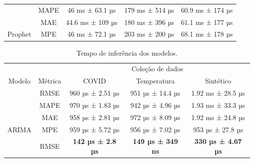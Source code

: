 \begin{table}[htbp]
\begin{tabular}{@{}ccccc@{}}
                                  & MAPE                      & \multicolumn{1}{c}{46 ms ± 63.1 µs}            & \multicolumn{1}{c}{179 ms ± 514 µs}           & 60.9 ms ± 174 µs          \\
                                  & MAE                       & \multicolumn{1}{c}{44.6 ms ± 109 µs}           & \multicolumn{1}{c}{180 ms ± 396 µs}           & 61.1 ms ± 177 µs          \\
        \multirow{-4}{*}{Prophet} & MPE                       & \multicolumn{1}{c}{46 ms ± 72.1 µs}            & \multicolumn{1}{c}{203 ms ± 200 µs}           & 68.1 ms ± 178 µs          \\ \bottomrule
    \end{tabular}
\end{table}

\begin{table}[htbp]
    \caption{Tempo de inferência dos modelos.}\label{tab:tempo_inferencia}
    \centering
    \begin{tabular}{@{}ccccc@{}} \toprule
                                  &                           & \multicolumn{3}{c}{Coleção de dados}                                                                                       \\ \cmidrule{3-5}
        \multirow{-2}{*}{Modelo}  & \multirow{-2}{*}{Métrica} & \multicolumn{1}{c}{COVID}                      & \multicolumn{1}{c}{Temperatura}               & Sintético                 \\ \midrule
                                  & RMSE                      & \multicolumn{1}{c}{960 µs ± 2.51 µs}           & \multicolumn{1}{c}{951 µs ± 14.4 µs}          & 1.92 ms ± 28.5 µs         \\
                                  & MAPE                      & \multicolumn{1}{c}{970 µs ± 1.83 µs}           & \multicolumn{1}{c}{942 µs ± 4.96 µs}          & 1.93 ms ± 33.3 µs         \\
                                  & MAE                       & \multicolumn{1}{c}{958 µs ± 2.81 µs}           & \multicolumn{1}{c}{972 µs ± 8.09 µs}          & 1.92 ms ± 24.8 µs         \\
        \multirow{-4}{*}{ARIMA}   & MPE                       & \multicolumn{1}{c}{959 µs ± 5.72 µs}           & \multicolumn{1}{c}{956 µs ± 7.02 µs}          & 953 µs ± 27.8 µs          \\ \midrule
                                  & RMSE                      & \multicolumn{1}{c}{\textbf{142 µs ± 2.8 µs}}   & \multicolumn{1}{c}{\textbf{149 µs ± 349 ns}}  & \textbf{330 µs ± 4.67 µs} \\

\end{tabular}
\end{table}
